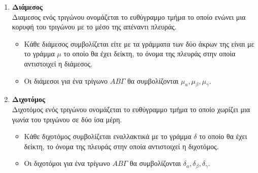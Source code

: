 \documentclass[twoside,nofonts,ektypwsh,shmeiwseis]{thewria}
\begin{document}
\begin{enumerate}[label=\bf\arabic*.]
\item \textbf{Διάμεσος}\\
Διαμεσος ενός τριγώνου ονομάζεται το ευθύγραμμο τμήμα το οποίο ενώνει μια κορυφή του τριγώνου με το μέσο της απέναντι πλευράς. \begin{itemize}
\item Κάθε διάμεσος συμβολίζεται είτε με τα γράμματα των δύο άκρων της είναι με το γράμμα $ \mu $ το οποίο θα έχει δείκτη, το όνομα της πλευράς στην οποία αντιστοιχεί η διάμεσος. 
\item Οι διάμεσοι για ένα τρίγωνο $ AB\varGamma $ θα συμβολίζονται $ \mu_a,\mu_\beta,\mu_\gamma $.
\end{itemize}
\item \textbf{Διχοτόμος}\\
Διχοτόμος ενός τριγώνου ονομάζεται το ευθύγραμμο τμήμα το οποίο χωρίζει μια γωνία του τριγώνου σε δύο ίσα μέρη.
\begin{itemize}
\item Κάθε διχοτόμος συμβολίζεται εναλλακτικά με το γράμμα $ \delta $ το οποίο θα έχει δείκτη, το όνομα της πλευράς στην οποία αντιστοιχεί η διχοτόμος. 
\item Οι διχοτόμοι για ένα τρίγωνο $ AB\varGamma $ θα συμβολίζονται $ \delta_a,\delta_\beta,\delta_\gamma $.
\end{itemize}
\end{enumerate}
\end{document}
